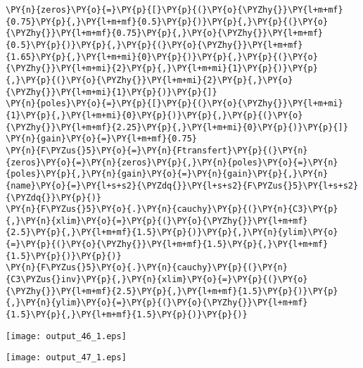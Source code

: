 \begin{tcolorbox}[breakable, size=fbox, boxrule=1pt, pad at break*=1mm,colback=cellbackground, colframe=cellborder]
\begin{Verbatim}[commandchars=\\\{\}]
\PY{n}{zeros}\PY{o}{=}\PY{p}{[}\PY{p}{(}\PY{o}{\PYZhy{}}\PY{l+m+mf}{0.75}\PY{p}{,}\PY{l+m+mf}{0.5}\PY{p}{)}\PY{p}{,}\PY{p}{(}\PY{o}{\PYZhy{}}\PY{l+m+mf}{0.75}\PY{p}{,}\PY{o}{\PYZhy{}}\PY{l+m+mf}{0.5}\PY{p}{)}\PY{p}{,}\PY{p}{(}\PY{o}{\PYZhy{}}\PY{l+m+mf}{1.65}\PY{p}{,}\PY{l+m+mi}{0}\PY{p}{)}\PY{p}{,}\PY{p}{(}\PY{o}{\PYZhy{}}\PY{l+m+mi}{2}\PY{p}{,}\PY{l+m+mi}{1}\PY{p}{)}\PY{p}{,}\PY{p}{(}\PY{o}{\PYZhy{}}\PY{l+m+mi}{2}\PY{p}{,}\PY{o}{\PYZhy{}}\PY{l+m+mi}{1}\PY{p}{)}\PY{p}{]}
\PY{n}{poles}\PY{o}{=}\PY{p}{[}\PY{p}{(}\PY{o}{\PYZhy{}}\PY{l+m+mi}{1}\PY{p}{,}\PY{l+m+mi}{0}\PY{p}{)}\PY{p}{,}\PY{p}{(}\PY{o}{\PYZhy{}}\PY{l+m+mf}{2.25}\PY{p}{,}\PY{l+m+mi}{0}\PY{p}{)}\PY{p}{]}
\PY{n}{gain}\PY{o}{=}\PY{l+m+mf}{0.75}
\PY{n}{F\PYZus{}5}\PY{o}{=}\PY{n}{Ftransfert}\PY{p}{(}\PY{n}{zeros}\PY{o}{=}\PY{n}{zeros}\PY{p}{,}\PY{n}{poles}\PY{o}{=}\PY{n}{poles}\PY{p}{,}\PY{n}{gain}\PY{o}{=}\PY{n}{gain}\PY{p}{,}\PY{n}{name}\PY{o}{=}\PY{l+s+s2}{\PYZdq{}}\PY{l+s+s2}{F\PYZus{}5}\PY{l+s+s2}{\PYZdq{}}\PY{p}{)}
\PY{n}{F\PYZus{}5}\PY{o}{.}\PY{n}{cauchy}\PY{p}{(}\PY{n}{C3}\PY{p}{,}\PY{n}{xlim}\PY{o}{=}\PY{p}{(}\PY{o}{\PYZhy{}}\PY{l+m+mf}{2.5}\PY{p}{,}\PY{l+m+mf}{1.5}\PY{p}{)}\PY{p}{,}\PY{n}{ylim}\PY{o}{=}\PY{p}{(}\PY{o}{\PYZhy{}}\PY{l+m+mf}{1.5}\PY{p}{,}\PY{l+m+mf}{1.5}\PY{p}{)}\PY{p}{)}
\PY{n}{F\PYZus{}5}\PY{o}{.}\PY{n}{cauchy}\PY{p}{(}\PY{n}{C3\PYZus{}inv}\PY{p}{,}\PY{n}{xlim}\PY{o}{=}\PY{p}{(}\PY{o}{\PYZhy{}}\PY{l+m+mf}{2.5}\PY{p}{,}\PY{l+m+mf}{1.5}\PY{p}{)}\PY{p}{,}\PY{n}{ylim}\PY{o}{=}\PY{p}{(}\PY{o}{\PYZhy{}}\PY{l+m+mf}{1.5}\PY{p}{,}\PY{l+m+mf}{1.5}\PY{p}{)}\PY{p}{)}
\end{Verbatim}
\end{tcolorbox}
\begin{center}
    \texttt{[image: output\_46\_1.eps]}
\end{center}
\begin{center}
    \texttt{[image: output\_47\_1.eps]}
\end{center}
